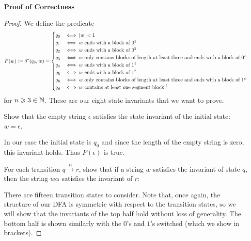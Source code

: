 	\textbf{Proof of Correctness}
    \begin{proof}
        We define the predicate 
        \[
        P(w) \defeq \delta^*(q_0, w) = 
        \begin{cases} 
            q_0 & \text{$\iff \abs w < 1$} \\
            q_1 & \text{$\iff w$ ends with a block of $0^1$} \\
            q_2 & \text{$\iff w$ ends with a block of $0^2$} \\
            q_3 & \text{$\iff w$ only contains blocks of length at least three and
            ends with a block of $0^n$} \\
            q_4 & \text{$\iff w$ ends with a block of $1^1$} \\
            q_5 & \text{$\iff w$ ends with a block of $1^2$} \\
            q_6 & \text{$\iff w$ only contains blocks of length at least three and
            ends with a block of $1^n$} \\
            q_d & \text{$\iff w$ contains at least one segment block 
            \footnotemark}
        \end{cases}
        \]
        for $n \geqslant 3 \in \mathbb{N}$.
        These are our eight state invariants that we want to prove.
        
        \newpage
        
        \base
        
        Show that the empty string $\epsilon$ satisfies the state invariant of 
        the initial state: $w = \epsilon$.
        
        In our case the initial state is $q_0$ and since the
        length of the empty string is zero, this invariant holds. Thus
        $P(\epsilon)$ is true.
        
        \istep 
        
        For each transition $q \xrightarrow{\alpha}r$, show that if a string $w$ satisfies the
        invariant of state $q$, then the string $w \alpha$ satisfies the invariant 
        of $r$: 
        
        There are fifteen transition states to consider.
        Note that, once again, the structure of our DFA is 
        symmetric with respect to the
        transition states, so we will show that the invariants of the top
        half hold without loss of generality. The bottom half is shown 
        similarly with the $0$'s and $1$'s switched (which we show in brackets).
        

\end{proof}
